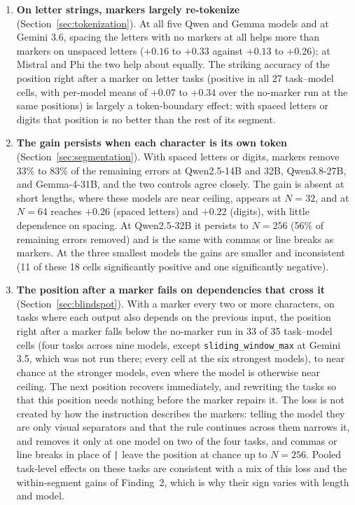 \documentclass[10pt]{article} %
\newcommand{\task}[1]{\texttt{#1}}
\begin{document}
\begin{enumerate}
\item \textbf{On letter strings, markers largely re-tokenize} (Section~\ref{sec:tokenization}). At all five Qwen and Gemma models and at Gemini 3.6, spacing the letters with no markers at all helps more than markers on unspaced letters ($+0.16$ to $+0.33$ against $+0.13$ to $+0.26$); at Mistral and Phi the two help about equally. The striking accuracy of the position right after a marker on letter tasks (positive in all 27 task--model cells, with per-model means of $+0.07$ to $+0.34$ over the no-marker run at the same positions) is largely a token-boundary effect: with spaced letters or digits that position is no better than the rest of its segment.
\item \textbf{The gain persists when each character is its own token} (Section~\ref{sec:segmentation}). With spaced letters or digits, markers remove 33\% to 83\% of the remaining errors at Qwen2.5-14B and 32B, Qwen3.8-27B, and Gemma-4-31B, and the two controls agree closely. The gain is absent at short lengths, where these models are near ceiling, appears at $N = 32$, and at $N = 64$ reaches $+0.26$ (spaced letters) and $+0.22$ (digits), with little dependence on spacing. At Qwen2.5-32B it persists to $N = 256$ (56\% of remaining errors removed) and is the same with commas or line breaks as markers. At the three smallest models the gains are smaller and inconsistent (11 of these 18 cells significantly positive and one significantly negative).
\item \textbf{The position after a marker fails on dependencies that cross it} (Section~\ref{sec:blindspot}). With a marker every two or more characters, on tasks where each output also depends on the previous input, the position right after a marker falls below the no-marker run in 33 of 35 task--model cells (four tasks across nine models, except \task{sliding\_window\_max} at Gemini 3.5, which was not run there; every cell at the six strongest models), to near chance at the stronger models, even where the model is otherwise near ceiling. The next position recovers immediately, and rewriting the tasks so that this position needs nothing before the marker repairs it. The loss is not created by how the instruction describes the markers: telling the model they are only visual separators and that the rule continues across them narrows it, and removes it only at one model on two of the four tasks, and commas or line breaks in place of \texttt{|} leave the position at chance up to $N = 256$. Pooled task-level effects on these tasks are consistent with a mix of this loss and the within-segment gains of Finding~2, which is why their sign varies with length and model.
\end{enumerate}
\end{document}
